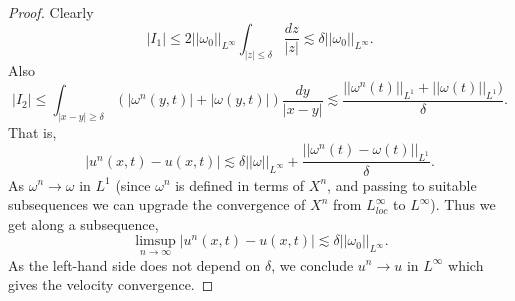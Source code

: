 \documentclass[12pt]{book}
\theoremstyle{definition}
\begin{document}
\begin{proof}
Clearly
$$|I_1| \leq 2||\omega_0||_{L^\infty} \int_{|z| \leq \delta} \frac{dz}{|z|} \lesssim \delta ||\omega_0||_{L^\infty}.$$
Also
$$|I_2| \leq \int_{|x - y| \geq \delta} (|\omega^n(y, t)| + |\omega(y, t)|)\frac{dy}{|x - y|} \lesssim \frac{||\omega^n(t)||_{L^1} + ||\omega(t)||_{L^1})}{\delta}.$$
That is,
$$|u^n(x, t) - u(x, t)| \lesssim \delta ||\omega||_{L^\infty} + \frac{||\omega^n(t) - \omega(t)||_{L^1}}{\delta}.$$
As $\omega^n \to \omega$ in $L^1$ (since $\omega^n$ is defined in terms of $X^n$, and passing to suitable subsequences we can upgrade the convergence of $X^n$ from $L^\infty_{loc}$ to $L^\infty$).
Thus we get along a subsequence,
$$\limsup_{n \to \infty} |u^n(x, t) - u(x, t)| \lesssim \delta ||\omega_0||_{L^\infty}.$$
As the left-hand side does not depend on $\delta$, we conclude $u^n \to u$ in $L^\infty$ which gives the velocity convergence.


\end{proof}
\end{document}
